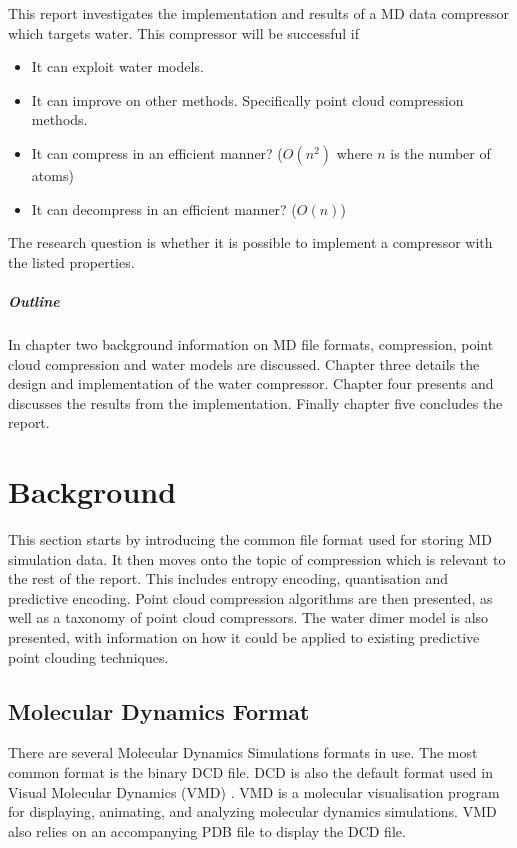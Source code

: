 \documentclass[a4paper]{report}
\begin{document}
This report investigates the implementation and results of a MD data
compressor which targets water. This compressor will be successful if

\begin{itemize}
  \item It can exploit water models.
  \item It can improve on other methods. Specifically point cloud compression
    methods.
  \item It can compress in an efficient manner? ($O(n^2)$ where $n$ is the
    number of atoms)
  \item It can decompress in an efficient manner? ($O(n)$)
\end{itemize}

The research question is whether it is possible to implement a compressor with
the listed properties.


\paragraph{Outline}

In chapter two background information on MD file formats, compression, point
cloud compression and water models are discussed. Chapter three details the
design and implementation of the water compressor. Chapter four presents and
discusses the results from the implementation. Finally chapter five concludes
the report.



\chapter{Background}

This section starts by introducing the common file format used for storing MD
simulation data. It then moves onto the topic of compression which is relevant
to the rest of the report. This includes entropy encoding, quantisation and
predictive encoding. Point cloud compression algorithms are then presented, as
well as a taxonomy of point cloud compressors. The water dimer model is also
presented, with information on how it could be applied to existing predictive
point clouding techniques.

\section{Molecular Dynamics Format}
\label{sec:molec-dynam-form}

There are several Molecular Dynamics Simulations formats in use. The most
common format is the binary DCD file. DCD is also the default format used in
Visual Molecular Dynamics (VMD) \citep{vmd}. VMD is a molecular visualisation
program for displaying, animating, and analyzing molecular dynamics
simulations. VMD also relies on an accompanying PDB file to display the DCD
file.
\end{document}
